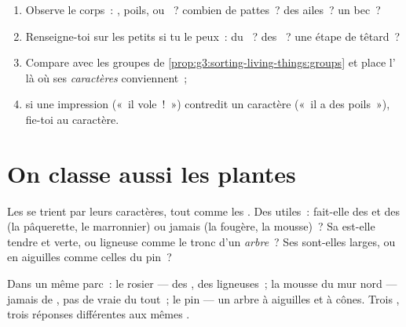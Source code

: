 \begin{method}\label{met:g3:sorting-living-things:sort}
\begin{enumerate}
  \item Observe le corps~: , poils,  ou ~? combien
        de pattes~? des ailes~? un bec~?
  \item Renseigne-toi sur les petits si tu le peux~: du ~? des
        ~? une étape de têtard~?
  \item Compare avec les groupes de
        \cref{prop:g3:sorting-living-things:groups} et place
        l' là où ses \emph{caractères} conviennent~;
  \item si une impression («~il vole~!~») contredit un caractère
        («~il a des poils~»), fie-toi au caractère.
\end{enumerate}
\end{method}

\section{On classe aussi les plantes}

\begin{proposition}\label{prop:g3:sorting-living-things:plants}
Les  se trient par leurs caractères, tout comme les .
Des  utiles~: fait-elle des \emph{} et des  (la
pâquerette, le marronnier) ou jamais (la fougère, la mousse)~? Sa
 est-elle tendre et verte, ou ligneuse comme le tronc d'un
\emph{arbre}~? Ses  sont-elles larges, ou en aiguilles comme
celles du pin~?
\end{proposition}
\admitted

\begin{example}\label{ex:g3:sorting-living-things:park}
Dans un même parc~: le rosier --- des , des  ligneuses~;
la mousse du mur nord --- jamais de , pas de vraie  du
tout~; le pin --- un arbre à aiguilles et à cônes. Trois ,
trois réponses différentes aux mêmes .
\end{example}

